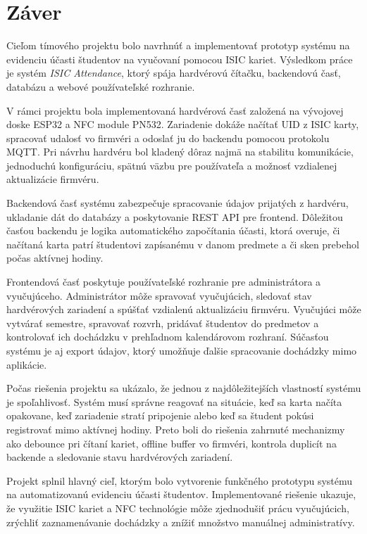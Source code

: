 \chapter{Záver}
\label{chap:conclusion}

Cieľom tímového projektu bolo navrhnúť a implementovať prototyp systému na evidenciu účasti študentov na vyučovaní pomocou ISIC kariet. Výsledkom práce je systém \textit{ISIC Attendance}, ktorý spája hardvérovú čítačku, backendovú časť, databázu a webové používateľské rozhranie.

V rámci projektu bola implementovaná hardvérová časť založená na vývojovej doske ESP32 a NFC module PN532. Zariadenie dokáže načítať UID z ISIC karty, spracovať udalosť vo firmvéri a odoslať ju do backendu pomocou protokolu MQTT. Pri návrhu hardvéru bol kladený dôraz najmä na stabilitu komunikácie, jednoduchú konfiguráciu, spätnú väzbu pre používateľa a možnosť vzdialenej aktualizácie firmvéru.

Backendová časť systému zabezpečuje spracovanie údajov prijatých z hardvéru, ukladanie dát do databázy a poskytovanie REST API pre frontend. Dôležitou časťou backendu je logika automatického započítania účasti, ktorá overuje, či načítaná karta patrí študentovi zapísanému v danom predmete a či sken prebehol počas aktívnej hodiny.

Frontendová časť poskytuje používateľské rozhranie pre administrátora a vyučujúceho. Administrátor môže spravovať vyučujúcich, sledovať stav hardvérových zariadení a spúšťať vzdialenú aktualizáciu firmvéru. Vyučujúci môže vytvárať semestre, spravovať rozvrh, pridávať študentov do predmetov a kontrolovať ich dochádzku v prehľadnom kalendárovom rozhraní. Súčasťou systému je aj export údajov, ktorý umožňuje ďalšie spracovanie dochádzky mimo aplikácie.

Počas riešenia projektu sa ukázalo, že jednou z najdôležitejších vlastností systému je spoľahlivosť. Systém musí správne reagovať na situácie, keď sa karta načíta opakovane, keď zariadenie stratí pripojenie alebo keď sa študent pokúsi registrovať mimo aktívnej hodiny. Preto boli do riešenia zahrnuté mechanizmy ako debounce pri čítaní kariet, offline buffer vo firmvéri, kontrola duplicít na backende a sledovanie stavu hardvérových zariadení.

Projekt splnil hlavný cieľ, ktorým bolo vytvorenie funkčného prototypu systému na automatizovanú evidenciu účasti študentov. Implementované riešenie ukazuje, že využitie ISIC kariet a NFC technológie môže zjednodušiť prácu vyučujúcich, zrýchliť zaznamenávanie dochádzky a znížiť množstvo manuálnej administratívy.


